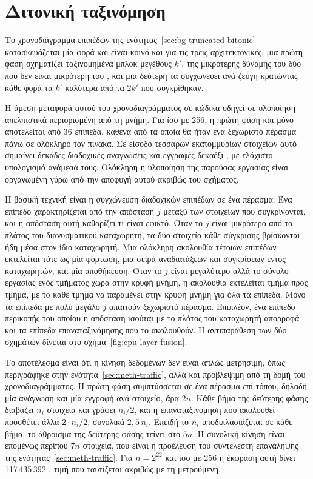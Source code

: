 \section{Διτονική ταξινόμηση}
\label{sec:cpu-bitonic}

Το χρονοδιάγραμμα επιπέδων της ενότητας~\ref{sec:bg-truncated-bitonic}
κατασκευάζεται μία φορά και είναι κοινό και για τις τρεις αρχιτεκτονικές: μια
πρώτη φάση σχηματίζει ταξινομημένα μπλοκ μεγέθους $k'$, της μικρότερης δύναμης
του δύο που δεν είναι μικρότερη του , και μια δεύτερη τα συγχωνεύει ανά
ζεύγη κρατώντας κάθε φορά τα $k'$ καλύτερα από τα $2k'$ που συγκρίθηκαν.

Η άμεση μεταφορά αυτού του χρονοδιαγράμματος σε κώδικα οδηγεί σε υλοποίηση
απελπιστικά περιορισμένη από τη μνήμη. Για  ίσο με 256, η πρώτη φάση και
μόνο αποτελείται από 36 επίπεδα, καθένα από τα οποία θα ήταν ένα ξεχωριστό
πέρασμα πάνω σε ολόκληρο τον πίνακα. Σε είσοδο τεσσάρων εκατομμυρίων στοιχείων
αυτό σημαίνει δεκάδες διαδοχικές αναγνώσεις και εγγραφές δεκαέξι
, με ελάχιστο υπολογισμό ανάμεσά τους. Ολόκληρη η υλοποίηση της
παρούσας εργασίας είναι οργανωμένη γύρω από την αποφυγή αυτού ακριβώς του
σχήματος.

Η βασική τεχνική είναι η συγχώνευση διαδοχικών επιπέδων σε ένα πέρασμα. Ένα
επίπεδο χαρακτηρίζεται από την απόσταση $j$ μεταξύ των στοιχείων που
συγκρίνονται, και η απόσταση αυτή καθορίζει τι είναι εφικτό. Όταν το $j$ είναι
μικρότερο από το πλάτος του διανυσματικού καταχωρητή, τα δύο στοιχεία κάθε
σύγκρισης βρίσκονται ήδη μέσα στον ίδιο καταχωρητή. Mια ολόκληρη ακολουθία
τέτοιων επιπέδων εκτελείται τότε ως μία φόρτωση, μια σειρά αναδιατάξεων και
συγκρίσεων εντός καταχωρητών, και μία αποθήκευση. Όταν το $j$ είναι μεγαλύτερο
αλλά το σύνολο εργασίας ενός τμήματος χωρά στην κρυφή μνήμη, η ακολουθία
εκτελείται τμήμα προς τμήμα, με το κάθε τμήμα να παραμένει στην κρυφή μνήμη για
όλα τα επίπεδα. Μόνο τα επίπεδα με πολύ μεγάλο $j$ απαιτούν ξεχωριστό πέρασμα.
Επιπλέον, ένα επίπεδο περικοπής του οποίου η απόσταση ισούται με το πλάτος του
καταχωρητή απορροφά και τα επίπεδα επαναταξινόμησης που το ακολουθούν. Η
αντιπαράθεση των δύο σχημάτων δίνεται στο σχήμα~\ref{fig:cpu-layer-fusion}.



Το αποτέλεσμα είναι ότι η κίνηση δεδομένων δεν είναι απλώς μετρήσιμη, όπως
περιγράφηκε στην ενότητα~\ref{sec:meth-traffic}, αλλά και προβλέψιμη από τη δομή
του χρονοδιαγράμματος. Η πρώτη φάση συμπτύσσεται σε ένα πέρασμα επί τόπου,
δηλαδή μία ανάγνωση και μία εγγραφή ανά στοιχείο, άρα $2n$. Κάθε βήμα της
δεύτερης φάσης διαβάζει $n_i$ στοιχεία και γράφει $n_i/2$, και η
επαναταξινόμηση που ακολουθεί προσθέτει άλλα $2 \cdot n_i/2$, συνολικά
$2{,}5\,n_i$. Επειδή το $n_i$ υποδιπλασιάζεται σε κάθε βήμα, το άθροισμα της
δεύτερης φάσης τείνει στο $5n$. Η συνολική κίνηση είναι επομένως περίπου $7n$
στοιχεία, που είναι η προέλευση του συντελεστή επανάληψης της
ενότητας~\ref{sec:meth-traffic}. Για $n = 2^{22}$ και  ίσο με 256 η
έκφραση αυτή δίνει 117\,435\,392 , τιμή που ταυτίζεται ακριβώς με τη
μετρούμενη.

